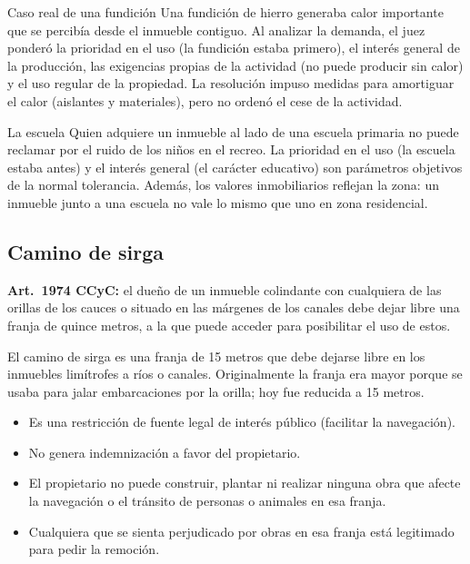 \documentclass[12pt,oneside]{book}
\begin{document}
\begin{example}{Caso real de una fundición}
Una fundición de hierro generaba calor importante que se percibía desde el inmueble contiguo. Al analizar la demanda, el juez ponderó la prioridad en el uso (la fundición estaba primero), el interés general de la producción, las exigencias propias de la actividad (no puede producir sin calor) y el uso regular de la propiedad. La resolución impuso medidas para amortiguar el calor (aislantes y materiales), pero no ordenó el cese de la actividad.
\end{example}

\begin{example}{La escuela}
Quien adquiere un inmueble al lado de una escuela primaria no puede reclamar por el ruido de los niños en el recreo. La prioridad en el uso (la escuela estaba antes) y el interés general (el carácter educativo) son parámetros objetivos de la normal tolerancia. Además, los valores inmobiliarios reflejan la zona: un inmueble junto a una escuela no vale lo mismo que uno en zona residencial.
\end{example}

\subsection{Camino de sirga}

\textbf{Art.~1974 CCyC:} el dueño de un inmueble colindante con cualquiera de las orillas de los cauces o situado en las márgenes de los canales debe dejar libre una franja de quince metros, a la que puede acceder para posibilitar el uso de estos.

El camino de sirga es una franja de 15 metros que debe dejarse libre en los inmuebles limítrofes a ríos o canales. Originalmente la franja era mayor porque se usaba para jalar embarcaciones por la orilla; hoy fue reducida a 15 metros.

\begin{itemize}
    \item Es una restricción de fuente legal de interés público (facilitar la navegación).
    \item No genera indemnización a favor del propietario.
    \item El propietario no puede construir, plantar ni realizar ninguna obra que afecte la navegación o el tránsito de personas o animales en esa franja.
    \item Cualquiera que se sienta perjudicado por obras en esa franja está legitimado para pedir la remoción.
\end{itemize}
\end{document}
